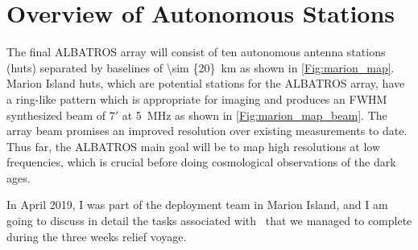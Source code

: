 \section{Overview of Autonomous Stations}

The final ALBATROS array will consist of ten autonomous antenna stations (huts) separated by baselines of \SI{\sim {20}}{km} as shown in \autoref{Fig:marion_map}. Marion Island huts, which are potential stations for the ALBATROS array, have a ring-like pattern which is appropriate for imaging and produces an FWHM synthesized beam of $7'$ at \SI{5}{\mega\hertz} as shown in \ref{Fig:marion_map_beam}. The array beam promises an improved resolution over existing measurements to date. Thus far, the ALBATROS main goal will be to map high resolutions at low frequencies, which is crucial before doing cosmological observations of the dark ages. 

In April 2019, I was part of the deployment team in Marion Island, and I am going to discuss in detail the tasks associated with \albatros\ that we managed to complete during the three weeks relief voyage.  

